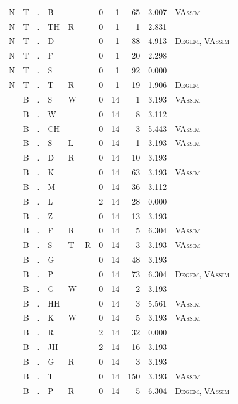 \documentclass[12pt]{article}
\begin{document}
\begin{longtable}{r@{ } r@{ } c@{ } l@{ } l@{ } l@{ } r r r r l }
N & T & . & B &  &  & 0 & 1 & 65 & 3.007 & \textsc{VAssim} \\
N & T & . & TH & R &  & 0 & 1 & 1 & 2.831 &  \\
N & T & . & D &  &  & 0 & 1 & 88 & 4.913 & \textsc{Degem}, \textsc{VAssim} \\
N & T & . & F &  &  & 0 & 1 & 20 & 2.298 &  \\
N & T & . & S &  &  & 0 & 1 & 92 & 0.000 &  \\
N & T & . & T & R &  & 0 & 1 & 19 & 1.906 & \textsc{Degem} \\
 & B & . & S & W &  & 0 & 14 & 1 & 3.193 & \textsc{VAssim} \\
 & B & . & W &  &  & 0 & 14 & 8 & 3.112 &  \\
 & B & . & CH &  &  & 0 & 14 & 3 & 5.443 & \textsc{VAssim} \\
 & B & . & S & L &  & 0 & 14 & 1 & 3.193 & \textsc{VAssim} \\
 & B & . & D & R &  & 0 & 14 & 10 & 3.193 &  \\
 & B & . & K &  &  & 0 & 14 & 63 & 3.193 & \textsc{VAssim} \\
 & B & . & M &  &  & 0 & 14 & 36 & 3.112 &  \\
 & B & . & L &  &  & 2 & 14 & 28 & 0.000 &  \\
 & B & . & Z &  &  & 0 & 14 & 13 & 3.193 &  \\
 & B & . & F & R &  & 0 & 14 & 5 & 6.304 & \textsc{VAssim} \\
 & B & . & S & T & R & 0 & 14 & 3 & 3.193 & \textsc{VAssim} \\
 & B & . & G &  &  & 0 & 14 & 48 & 3.193 &  \\
 & B & . & P &  &  & 0 & 14 & 73 & 6.304 & \textsc{Degem}, \textsc{VAssim} \\
 & B & . & G & W &  & 0 & 14 & 2 & 3.193 &  \\
 & B & . & HH &  &  & 0 & 14 & 3 & 5.561 & \textsc{VAssim} \\
 & B & . & K & W &  & 0 & 14 & 5 & 3.193 & \textsc{VAssim} \\
 & B & . & R &  &  & 2 & 14 & 32 & 0.000 &  \\
 & B & . & JH &  &  & 2 & 14 & 16 & 3.193 &  \\
 & B & . & G & R &  & 0 & 14 & 3 & 3.193 &  \\
 & B & . & T &  &  & 0 & 14 & 150 & 3.193 & \textsc{VAssim} \\
 & B & . & P & R &  & 0 & 14 & 5 & 6.304 & \textsc{Degem}, \textsc{VAssim} \\

\end{longtable}
\end{document}
